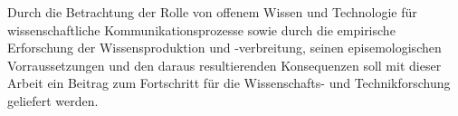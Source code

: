 Durch die Betrachtung der Rolle von offenem Wissen und Technologie für wissenschaftliche Kommunikationsprozesse sowie durch die empirische Erforschung der Wissensproduktion und -verbreitung, seinen episemologischen Vorraussetzungen und den daraus resultierenden Konsequenzen \cite{beck_2014_science} soll mit dieser Arbeit ein Beitrag zum Fortschritt für die Wissenschafts- und Technikforschung geliefert werden.
